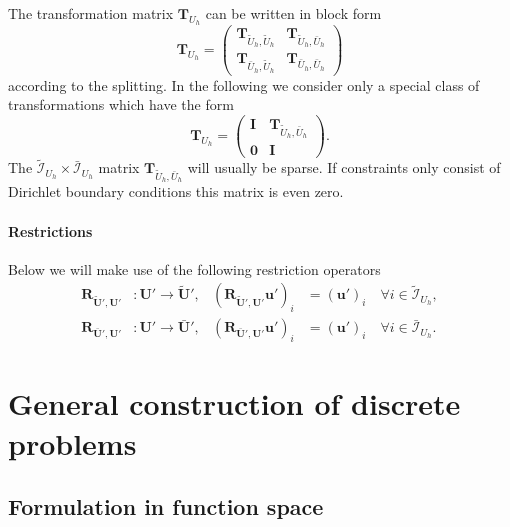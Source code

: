 The transformation matrix $\mathbf{T}_{U_h}$ can be written in block
form 
\begin{equation*}
\mathbf{T}_{U_h} = \left(\begin{array}{cc}
\mathbf{T}_{\tilde{U}_h,\tilde{U}_h} & \mathbf{T}_{\tilde{U}_h,\bar{U}_h}\\
\mathbf{T}_{\bar{U}_h,\tilde{U}_h} & \mathbf{T}_{\bar{U}_h,\bar{U}_h}
\end{array}\right)
\end{equation*}
according to the splitting. In the following we consider only a
special class of transformations which have the form
\begin{equation}\label{Eq:StructureTransformation}
\mathbf{T}_{U_h} = \left(\begin{array}{cc}
\mathbf{I} & \mathbf{T}_{\tilde{U}_h,\bar{U}_h}\\
\mathbf{0} & \mathbf{I}
\end{array}\right).
\end{equation}
The $\tilde{\mathcal{I}}_{U_h} \times \bar{\mathcal{I}}_{U_h}$  matrix
$\mathbf{T}_{\tilde{U}_h,\bar{U}_h}$ will usually be sparse.  If constraints only consist
of Dirichlet boundary conditions this matrix is even zero.

\paragraph{Restrictions} Below we will make use of the following restriction operators
\begin{align}
\mathbf{R}_{\tilde{\mathbf{U}}',\mathbf{U}'} &: \mathbf{U}' \to \tilde{\mathbf{U}}', & 
(\mathbf{R}_{\tilde{\mathbf{U}}',\mathbf{U}'}\mathbf{u}')_i &= 
(\mathbf{u}')_i \quad \forall i\in \tilde{\mathcal{I}}_{U_h},\\
\mathbf{R}_{\bar{\mathbf{U}}',\mathbf{U}'} &: \mathbf{U}' \to \bar{\mathbf{U}}', & 
(\mathbf{R}_{\bar{\mathbf{U}}',\mathbf{U}'}\mathbf{u}')_i &= 
(\mathbf{u}')_i \quad \forall i\in \bar{\mathcal{I}}_{U_h}.
\end{align}

 
\section{General construction of discrete problems}\label{Sec:Problems}

\subsection{Formulation in function space}

